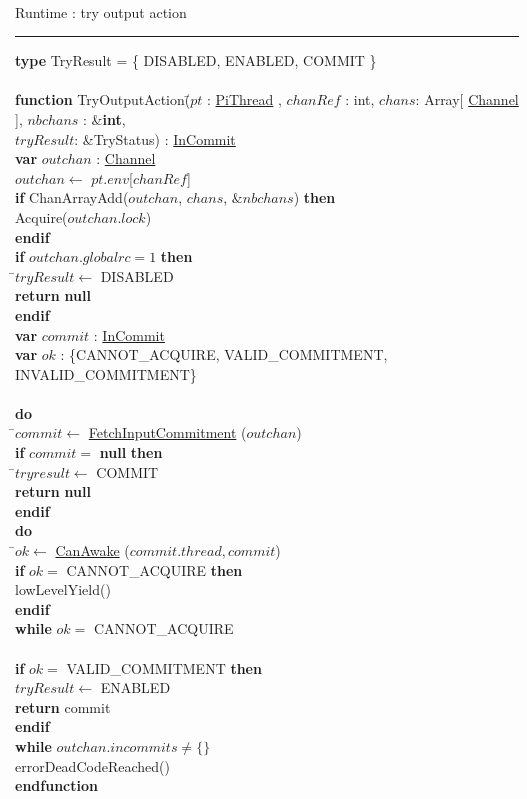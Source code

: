 \documentclass[a4paper,11pt]{article}
\newenvironment{program}{
  \begin{sffamily}
  \begin{scriptsize}
  \begin{tabbing}}
 {\end{tabbing}
  \end{scriptsize}
  \end{sffamily}}
\newcommand{\kw}[1]{\textsf{\textbf{#1}}}
\newcommand{\pindent}{\hspace{2em}\=}
\newcommand{\synchro}[1]{\textcolor{synchrocolor}{#1}}
\newcommand{\algotitle}[1]{\noindent\\ \noindent#1\par\nobreak\vspace{3pt}\hrule\vspace{6pt}}
\newcommand{\algosection}[1]{
  \phantomsection
  \algotitle{#1}
}
\newcommand{\myref}[1]{
  \hyperref[#1]{#1}
}
\begin{document}
\algosection{Runtime : try output action}
\begin{program}
  \kw{type} TryResult = \{ DISABLED, ENABLED, COMMIT \} \\
\\
  \kw{function} TryOutputAction(\=$pt$ : \myref{PiThread}, $chanRef$ : int, $chans$: Array[\myref{Channel}], $nbchans$ : \&\kw{int},\\
\> $tryResult$: \&TryStatus) : \myref{InCommit} \\
  \pindent \kw{var} $outchan$ : \myref{Channel} \\
  \> $outchan \leftarrow$ $pt$.$env$[$chanRef$] \\
  \pindent \kw{if} ChanArrayAdd($outchan$, $chans$, $\&nbchans$) \kw{then} \\
  \>\pindent\synchro{Acquire($outchan.lock$)} \\
  \>\kw{endif} \\
  \>\kw{if} $outchan.globalrc = 1$ \kw{then} \\
  \>\pindent$tryResult \leftarrow$ DISABLED \\
  \>\>\kw{return} \kw{null} \\
  \>\kw{endif} \\
  \>\kw{var} $commit$ : \myref{InCommit} \\
  \>\kw{var} $ok$ : \{CANNOT\_ACQUIRE, VALID\_COMMITMENT, INVALID\_COMMITMENT\} \\
  \>\\
  \>\kw{do} \\
  \>\pindent$commit \leftarrow$ \myref{FetchInputCommitment}($outchan$) \\
  \>\>\kw{if} $commit =$ \kw{null} \kw{then} \\
  \>\>\pindent$tryresult \leftarrow$ COMMIT \\
  \>\>\>\kw{return} \kw{null} \\
  \>\>\kw{endif} \\

  \>\>\kw{do} \\
  \>\>\pindent$ok \leftarrow$ \myref{CanAwake}($commit.thread, commit$) \\
  \>\>\>\kw{if} $ok =$ CANNOT\_ACQUIRE \kw{then} \\
  \>\>\>\pindent\synchro{lowLevelYield()} \\
  \>\>\>\kw{endif} \\
  \>\>\kw{while} $ok =$ CANNOT\_ACQUIRE \\
  \>\>\\
  \>\>\kw{if} $ok =$ VALID\_COMMITMENT \kw{then} \\
  \>\>\> $tryResult \leftarrow$ ENABLED \\
  \>\>\> \kw{return} commit \\
  \>\>\kw{endif} \\
  \>\kw{while} $outchan.incommits \neq \{\}$ \\
  errorDeadCodeReached() \\
  \kw{endfunction}
\end{program}
\end{document}
